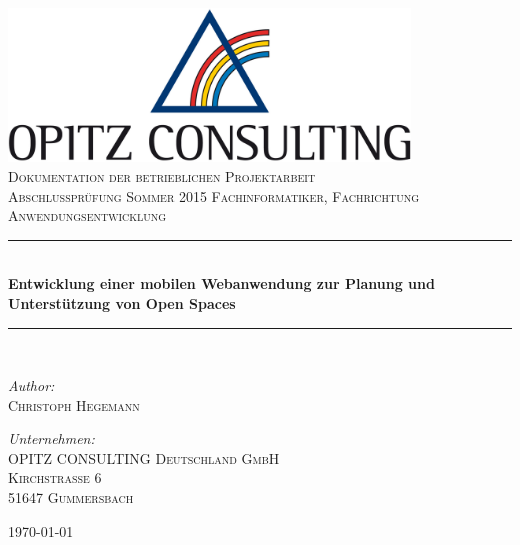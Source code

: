 \begin{titlepage}
\begin{center}

\includegraphics[width=0.80\textwidth]{img/oc-logo.jpg}\\[1cm]

\textsc{\LARGE Dokumentation der betrieblichen Projektarbeit}\\[1.5cm]

\textsc{\Large Abschlussprüfung Sommer 2015 Fachinformatiker, Fachrichtung Anwendungsentwicklung}\\[0.5cm]

\newcommand{\HRule}{\rule{\linewidth}{0.5mm}}
\HRule\\[0.4cm]
{ \huge \bfseries Entwicklung einer mobilen Webanwendung zur Planung und Unterstützung von Open Spaces}\\[0.4cm]
\HRule\\[1.0cm]

\begin{minipage}{0.4\textwidth}
\begin{flushleft} \large
\emph{Author:}\\
\textsc{Christoph Hegemann}
\end{flushleft}
\end{minipage}
\hfill
\begin{minipage}{0.5\textwidth}
\begin{flushright} \large
\emph{Unternehmen:} \\
\textsc{OPITZ CONSULTING Deutschland GmbH}\\
\textsc{Kirchstraße 6}\\
\textsc{51647 Gummersbach}\\
\end{flushright}
\end{minipage}

\vfill
{\large \today}
\end{center}
\end{titlepage}

